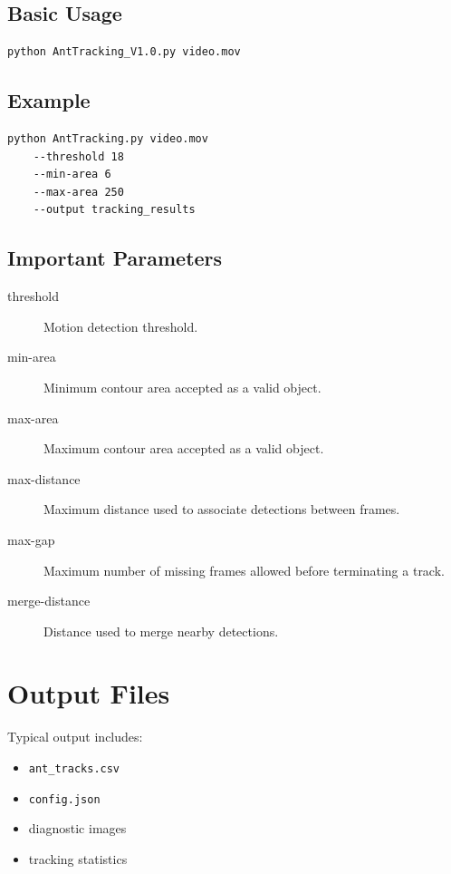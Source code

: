 \documentclass[11pt,a4paper]{article}
\begin{document}
\subsection{Basic Usage}

\begin{verbatim}
python AntTracking_V1.0.py video.mov
\end{verbatim}

\subsection{Example}

\begin{verbatim}
python AntTracking.py video.mov
    --threshold 18
    --min-area 6
    --max-area 250
    --output tracking_results
\end{verbatim}

\subsection{Important Parameters}

\begin{description}

\item[threshold]
Motion detection threshold.

\item[min-area]
Minimum contour area accepted as a valid object.

\item[max-area]
Maximum contour area accepted as a valid object.

\item[max-distance]
Maximum distance used to associate detections between frames.

\item[max-gap]
Maximum number of missing frames allowed before terminating a track.

\item[merge-distance]
Distance used to merge nearby detections.

\end{description}

\section{Output Files}

Typical output includes:

\begin{itemize}
\item \texttt{ant\_tracks.csv}
\item \texttt{config.json}
\item diagnostic images
\item tracking statistics
\end{itemize}
\end{document}

